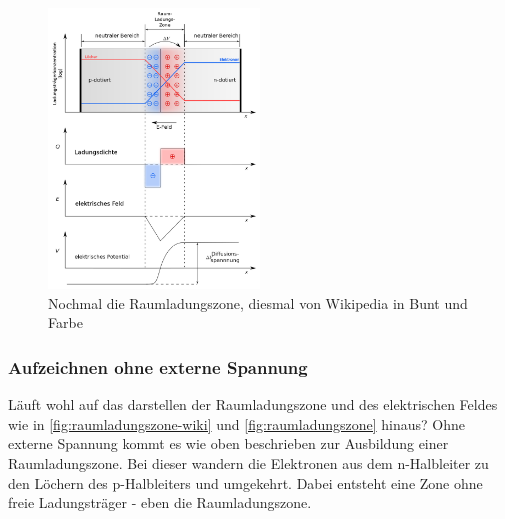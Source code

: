 \documentclass{article}
\begin{document}
       \begin{figure}[H]
        \centering
        \includegraphics[width=0.5\textwidth]{fig/raumladungszone-wiki}
        \caption{Nochmal die Raumladungszone, diesmal von Wikipedia in Bunt und Farbe}
        \label{fig:raumladungszone-wiki}
    \end{figure}


	\subsubsection{Aufzeichnen ohne externe Spannung}
	Läuft wohl auf das darstellen der Raumladungszone und des elektrischen Feldes wie in \autoref{fig:raumladungszone-wiki} und \autoref{fig:raumladungszone} hinaus?
	Ohne externe Spannung kommt es wie oben beschrieben zur Ausbildung einer Raumladungszone. Bei dieser wandern die Elektronen aus dem n-Halbleiter zu den Löchern des p-Halbleiters und umgekehrt. Dabei entsteht eine Zone ohne freie Ladungsträger - eben die Raumladungszone. 
	
\end{document}
